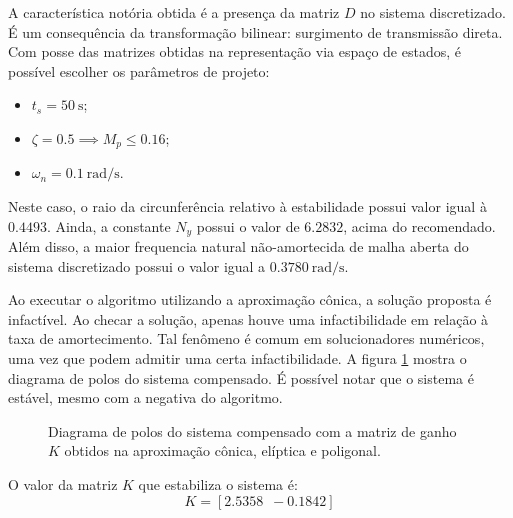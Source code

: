 A característica notória obtida é a presença da matriz $D$ no sistema discretizado. É um consequência da transformação bilinear: surgimento de transmissão direta. Com posse das matrizes obtidas na representação via espaço de estados, é possível escolher os parâmetros de projeto:
\begin{itemize}
  \item $t_s = \SI{50}{\second}$;
  \item $\zeta = 0.5 \implies M_p \leq 0.16$;
  \item $\omega_n = \SI{0.1}{\radian/\second}$.
\end{itemize}

Neste caso, o raio da circunferência relativo à estabilidade possui valor igual à $0.4493$. Ainda, a constante $N_y$ possui o valor de $6.2832$, acima do recomendado. Além disso, a maior frequencia natural não-amortecida de malha aberta do sistema discretizado possui o valor igual a $\SI{0.3780}{\radian/\second}$.

Ao executar o algoritmo utilizando a aproximação cônica, a solução proposta é infactível. Ao checar a solução, apenas houve uma infactibilidade em relação à taxa de amortecimento. Tal fenômeno é comum em solucionadores numéricos, uma vez que podem admitir uma certa infactibilidade. A figura \ref{subfig:TesteC} mostra o diagrama de polos do sistema compensado. É possível notar que o sistema é estável, mesmo com a negativa do algoritmo.

\begin{figure}[!ht]
  \centering
  \begin{subfigure}[t]{0.3\columnwidth}
    
      \caption{}
      \label{subfig:TesteC}
  \end{subfigure}
  \begin{subfigure}[t]{0.3\columnwidth}
    
      \caption{}
      \label{subfig:TesteE}
  \end{subfigure}
  \begin{subfigure}[t]{0.3\columnwidth}
    
    \caption{}
    \label{subfig:TesteP}
  \end{subfigure}
  \caption{Diagrama de polos do sistema compensado com a matriz de ganho $K$ obtidos na aproximação cônica,  elíptica e  poligonal.}
  \label{fig:PrimeiroTeste}
\end{figure}

O valor da matriz $K$ que estabiliza o sistema é:
\begin{equation}
  K = \left[2.5358 \enspace -0.1842\right]\label{res:GanhoC}
\end{equation}

